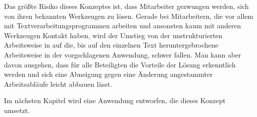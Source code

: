 Das größte Risiko dieses Konzeptes ist, dass Mitarbeiter gezwungen werden, sich von ihren bekannten Werkzeugen zu lösen. Gerade bei Mitarbeitern, die vor allem mit Textverarbeitungsprogrammen arbeiten und ansonsten kaum mit anderen Werkzeugen Kontakt haben, wird der Umstieg von der unstrukturierten Arbeitsweise in  auf die, bis auf den einzelnen Text heruntergebrochene Arbeitsweise in der vorgschlagenen Anwendung, schwer fallen. Man kann aber davon ausgehen, dass für alle Beteiligten die Vorteile der Lösung erkenntlich werden und sich eine Abneigung gegen eine Änderung angestammter Arbeitsabläufe leicht abbauen lässt.

\secbar

Im nächsten Kapitel wird eine Anwendung entworfen, die dieses Konzept umsetzt.

\pagebreak